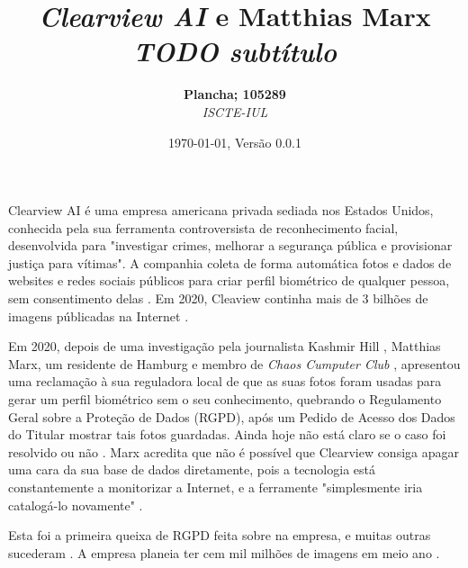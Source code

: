 \documentclass[portuguese, 12pt]{../diazessay}
\title{\textbf{\textit{Clearview AI} e Matthias Marx} \\ {\Large\itshape TODO subtítulo}}
\author{\textbf{Plancha; 105289} \\ \textit{ISCTE-IUL}}
\date{\today , Versão 0.0.1}
\begin{document}
\maketitle
Clearview AI é uma empresa americana privada sediada nos Estados Unidos, conhecida pela sua ferramenta controversista \parencite{nytClearview, CVBan} de reconhecimento facial, desenvolvida para "investigar crimes, melhorar a segurança pública e provisionar justiça para vítimas". A companhia coleta de forma automática fotos e dados de websites e redes sociais públicos para criar perfil biométrico de qualquer pessoa, sem consentimento delas \parencite{EUpresp}. Em 2020, Cleaview continha mais de 3 bilhões de imagens públicadas na Internet \parencite{EUpresp}.

Em 2020, depois de uma investigação pela journalista Kashmir Hill \citeyear{nytClearview}, Matthias Marx, um residente de Hamburg e membro de \textit{Chaos Cumputer Club} \parencite{LegalComp}, apresentou uma reclamação à sua reguladora local de que as suas fotos foram usadas para gerar um perfil biométrico sem o seu conhecimento, quebrando o Regulamento Geral sobre a Proteção de Dados (RGPD), após um Pedido de Acesso dos Dados do Titular mostrar tais fotos guardadas. Ainda hoje não está claro se o caso foi resolvido ou não \parencite{wired}. Marx acredita que não é possível que Clearview consiga apagar uma cara da sua base de dados diretamente, pois a tecnologia está constantemente a monitorizar a Internet, e a ferramente "simplesmente iria catalogá-lo novamente" \parencite{wired}.

Esta foi a primeira queixa de RGPD feita sobre na empresa, e muitas outras sucederam \parencite{LegalComp}. A empresa planeia ter cem mil milhões de imagens em meio ano \parencite{expansion}.


\printbibliography[title=Referências]
\end{document}
